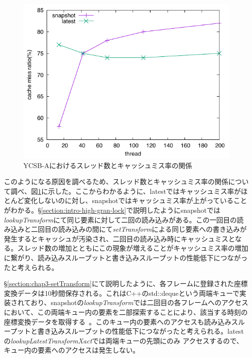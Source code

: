 \documentclass[a4paper]{jreport}	%
\begin{document}
\begin{figure}[h] 
\centering
\includegraphics[width=15cm]{cache-a}
\caption{YCSB-Aにおけるスレッド数とキャッシュミス率の関係}
\label{fig:a-cache}
\end{figure}


このようになる原因を調べるため、スレッド数とキャッシュミス率の関係について調べ、図\ref{fig:a-cache}に示した。ここからわかるように、latestではキャッシュミス率がほとんど変化しないのに対し、snapshotではキャッシュミス率が上がっていることがわかる。§\ref{section:intro-high-gran-lock}で説明したようにsnapshotでは\textit{lookupTransform}にて同じ要素に対して二回の読み込みがある。この一回目の読み込みと二回目の読み込みの間にて\textit{setTransform}による同じ要素への書き込みが発生するとキャッシュが汚染され、二回目の読み込み時にキャッシュミスとなる。スレッド数の増加とともにこの現象が増えることがキャッシュミス率の増加に繋がり、読み込みスループットと書き込みスループットの性能低下につながったと考えられる。

§\ref{section:chap3-setTransform}にて説明したように、各フレームに登録された座標変換データは10秒間保存される。これはC++のstd::dequeという両端キューで実装されており、snapshotの\textit{lookupTransform}では二回目の各フレームへのアクセスにおいて、この両端キュー内の要素を二部探索することにより、該当する時刻の座標変換データを取得する~\cite{timecache-search}。このキュー内の要素へのアクセスも読み込みスループットと書き込みスループットの性能低下につながったと考えられる。latestの\textit{lookupLatestTransformXact}では両端キューの先頭にのみ
アクセスするので、キュー内の要素へのアクセスは発生しない。
\end{document}
